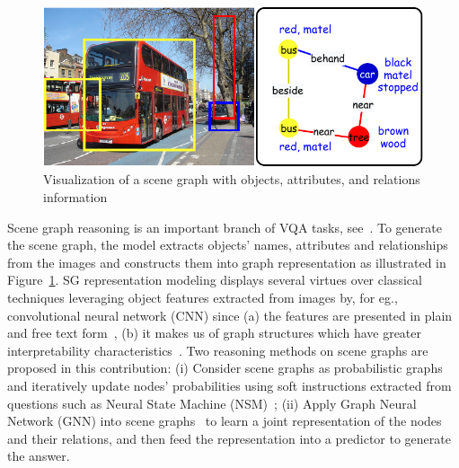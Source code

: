 \documentclass[letterpaper]{article} %
\begin{document}
\begin{figure}[ht] 
    \vspace{-0.1in}
    \centering 
    \includegraphics[scale=0.5]{./pic/intro.pdf} 
    \caption{Visualization of a scene graph with objects, attributes, and relations information} 
    \label{scene-graph} 
\end{figure}

Scene graph reasoning is an important branch of VQA tasks, see~\cite{DBLP:journals/corr/abs-2007-01072}. 
To generate the scene graph, the model extracts objects' names, attributes and relationships from the images and constructs them into graph representation as illustrated in Figure~\ref{scene-graph}. 
SG representation modeling displays several virtues over classical techniques leveraging object features extracted from images by, for eg., convolutional neural network (CNN) since (a) the features are presented in plain and free text form~\cite{DBLP:journals/corr/abs-2101-05479}, (b) it makes us of graph structures which have greater interpretability characteristics~\cite{DBLP:conf/bmvc/ZhangCX19}.
Two reasoning methods on scene graphs are proposed in this contribution: (i) Consider scene graphs as probabilistic graphs and iteratively update nodes' probabilities using soft instructions extracted from questions such as Neural State Machine (NSM)~\cite{DBLP:conf/nips/HudsonM19,DBLP:conf/ijcnn/LeLV020}; (ii) Apply Graph Neural Network (GNN) into scene graphs~\cite{inproceedings,DBLP:conf/iccv/LiGCL19} to learn a joint representation of the nodes and their relations, and then feed the representation into a predictor to generate the answer.
\end{document}
